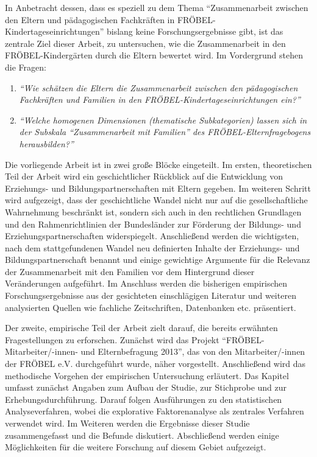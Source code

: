 \documentclass[12pt,a4paper]{article}
\begin{document}
In Anbetracht dessen, dass es speziell zu dem Thema "`Zusammenarbeit zwischen den Eltern und pädagogischen Fachkräften in FRÖBEL-Kin\-der\-ta\-ges\-ein\-rich\-tun\-gen"' bislang keine Forschungsergebnisse gibt, ist das zentrale Ziel dieser Arbeit, zu untersuchen, wie die Zusammenarbeit in den FRÖBEL-Kindergärten durch die Eltern bewertet wird. Im Vordergrund stehen die Fragen:
\begin{enumerate}
\item \textit{"`Wie schätzen die Eltern die Zusammenarbeit zwischen den pädagogischen Fachkräften und Familien in den FRÖBEL-Kindertageseinrichtungen ein?"'}
\item \textit{"`Welche homogenen Dimensionen (thematische Subkategorien) lassen sich in der Subskala "`Zusammenarbeit mit Familien"' des FRÖBEL-Eltern\-fra\-ge\-bo\-gens herausbilden?"'}
\end{enumerate}

Die vorliegende Arbeit ist in zwei große Blöcke eingeteilt. Im ersten, theoretischen Teil der Arbeit wird ein geschichtlicher Rückblick auf die Entwicklung von Erziehungs- und Bildungspartnerschaften mit Eltern gegeben. Im weiteren Schritt  wird aufgezeigt, dass der geschichtliche Wandel nicht nur auf die gesellschaftliche Wahrnehmung beschränkt ist, sondern sich auch in den rechtlichen Grundlagen und den Rahmenrichtlinien der Bundesländer zur Förderung der Bildungs- und Erziehungspartnerschaften widerspiegelt. Anschließend werden die wichtigsten, nach dem stattgefundenen Wandel neu definierten Inhalte der Erziehungs- und Bildungspartnerschaft benannt und einige gewichtige Argumente für die Relevanz der Zusammenarbeit mit den Familien vor dem Hintergrund dieser Veränderungen aufgeführt. Im Anschluss werden die bisherigen empirischen Forschungsergebnisse aus der gesichteten einschlägigen Literatur und weiteren analysierten Quellen wie fachliche Zeitschriften, Datenbanken etc. präsentiert.

Der zweite, empirische Teil der Arbeit zielt darauf, die bereits erwähnten Fragestellungen zu erforschen. Zunächst wird das Projekt "`FRÖBEL-Mitarbeiter/-innen- und Elternbefragung 2013"', das von den Mit\-arbei\-ter/-innen der FRÖBEL e.V. durchgeführt wurde, näher vorgestellt. Anschließend wird das methodische Vorgehen der empirischen Untersuchung erläutert. Das Kapitel umfasst zunächst Angaben zum Aufbau der Studie, zur Stichprobe und zur Erhebungsdurchführung. Darauf folgen Ausführungen zu den statistischen Analyseverfahren, wobei die explorative Faktorenanalyse als zentrales Verfahren verwendet wird. Im Weiteren werden die Ergebnisse dieser Studie zusammengefasst und die Befunde diskutiert. Abschließend werden einige Möglichkeiten für die weitere Forschung auf diesem Gebiet aufgezeigt.	
	
\end{document}
